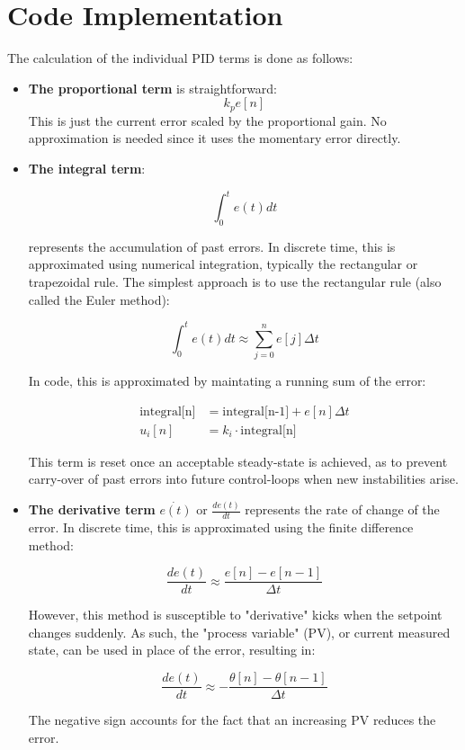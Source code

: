 \documentclass[11pt]{scrartcl}
\begin{document}
\section{Code Implementation}

The calculation of the individual PID terms is done as follows:

\begin{itemize}
	
	
\item \textbf{The proportional term} is straightforward:
\[
k_p e[n]
\]
This is just the current error scaled by the proportional gain. No approximation is needed since it uses the momentary error directly.


\item \textbf{The integral term}:

\[
\int_{0}^{t} e(t) dt
\]

represents the accumulation of past errors. In discrete time, this is approximated using numerical integration, typically the rectangular or trapezoidal rule. The simplest approach is to use the rectangular rule (also called the Euler method):

\[
\int_{0}^{t} e(t) dt \approx \sum_{j=0}^{n} e[j] \Delta t
\]

In code, this is approximated by maintating a running sum of the error:

\[
\begin{aligned}
	\text{integral[n]} &= \text{integral[n-1]} + e[n] \Delta t \\
	u_i[n] &= k_i \cdot \text{integral[n]}
\end{aligned}
\]

This term is reset once an acceptable steady-state is achieved, as to prevent carry-over of past errors into future control-loops when new instabilities arise.

\item \textbf{The derivative term} \(\dot{e(t)}\) or \(\frac{de(t)}{dt}\) represents the rate of change of the error. In discrete time, this is approximated using the finite difference method:

\[
\frac{de(t)}{dt} \approx \frac{e[n]-e[n-1]}{\Delta t}
\]

However, this method is susceptible to "derivative" kicks when the setpoint changes suddenly. As such, the "process variable" (PV), or current measured state, can be used in place of the error, resulting in: 

\[
\frac{de(t)}{dt} \approx -\frac{\theta[n] - \theta[n-1]}{\Delta t}
\]

The negative sign accounts for the fact that an increasing PV reduces the error.

\end{itemize}
\end{document}
